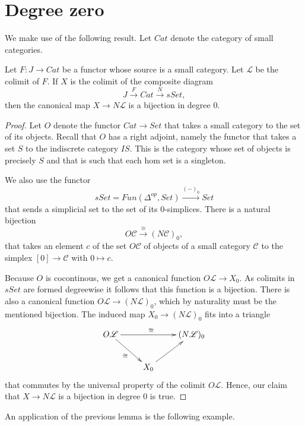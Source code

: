 
\section{Degree zero}
\label{sec:dzero}


We make use of the following result. Let $Cat$ denote the category of small categories.
\begin{lemma}\label{lem:degree_zero_colimit_category_nerve}
Let $F:J\to Cat$ be a functor whose source is a small category. Let $\mathscr{L}$ be the colimit of $F$. If $X$ is the colimit of the composite diagram
\[J\xrightarrow{F} Cat\xrightarrow{N} sSet,\]
then the canonical map $X\to N\mathscr{L}$ is a bijection in degree $0$.
\end{lemma}
\begin{proof}
Let $O$ denote the functor $Cat\to Set$ that takes a small category to the set of its objects. Recall that $O$ has a right adjoint, namely the functor that takes a set $S$ to the indiscrete category $IS$. This is the category whose set of objects is precisely $S$ and that is such that each hom set is a singleton.

We also use the functor
\[sSet=Fun(\Delta ^{op},Set)\xrightarrow{(-)_0} Set\]
that sends a simplicial set to the set of its $0$-simplices. There is a natural bijection
\[O\mathscr{C} \xrightarrow{\cong} (N\mathscr{C} )_0,\]
that takes an element $c$ of the set $O\mathscr{C}$ of objects of a small category $\mathscr{C}$ to the simplex $[0]\to \mathscr{C}$ with $0\mapsto c$.

Because $O$ is cocontinous, we get a canonical function $O\mathscr{L} \to X_0$. As colimits in $sSet$ are formed degreewise it follows that this function is a bijection. There is also a canonical function $O\mathscr{L} \to (N\mathscr{L} )_0$, which by naturality must be the mentioned bijection. The induced map $X_0\to (N\mathscr{L} )_0$ fits into a triangle
\begin{displaymath}
\xymatrix{
O\mathscr{L} \ar[dr]_\cong \ar[rr]^\cong && (N\mathscr{L} )_0 \\
& X_0 \ar[ur] \\
}
\end{displaymath}
that commutes by the universal property of the colimit $O\mathscr{L}$. Hence, our claim that $X\to N\mathscr{L}$ is a bijection in degree $0$ is true.
\end{proof}
\noindent An application of the previous lemma is the following example.
